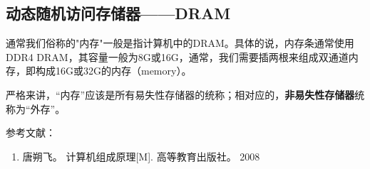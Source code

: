 \subsection{动态随机访问存储器——DRAM}


通常我们俗称的"内存"一般是指计算机中的DRAM。具体的说，内存条通常使用DDR4 DRAM，其容量一般为8G或16G，通常，我们需要插两根来组成双通道内存，即构成16G或32G的内存（memory）。

严格来讲，“内存”应该是所有易失性存储器的统称；相对应的，\textbf{非易失性存储器}统称为“外存”。






参考文献：
\begin{enumerate}
\item 唐朔飞。 计算机组成原理[M]. 高等教育出版社。 2008
\end{enumerate}
